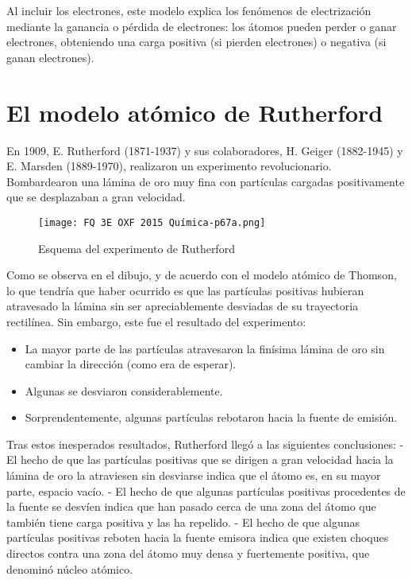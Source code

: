 \documentclass[
  spanish,
]{article}
\providecommand{\tightlist}{%
  \setlength{\itemsep}{0pt}\setlength{\parskip}{0pt}}
\begin{document}
Al incluir los electrones, este modelo explica los fenómenos de
electrización mediante la ganancia o pérdida de electrones: los átomos
pueden perder o ganar electrones, obteniendo una carga positiva (si
pierden electrones) o negativa (si ganan electrones).

\hypertarget{el-modelo-atuxf3mico-de-rutherford}{%
\section{El modelo atómico de
Rutherford}\label{el-modelo-atuxf3mico-de-rutherford}}

En 1909, E. Rutherford (1871-1937) y sus colaboradores, H. Geiger
(1882-1945) y E. Marsden (1889-1970), realizaron un experimento
revolucionario. Bombardearon una lámina de oro muy fina con partículas
cargadas positivamente que se desplazaban a gran velocidad.

\begin{figure}
\centering
\texttt{[image: FQ 3E OXF 2015 Química-p67a.png]}
\caption{Esquema del experimento de Rutherford}
\end{figure}

Como se observa en el dibujo, y de acuerdo con el modelo atómico de
Thomson, lo que tendría que haber ocurrido es que las partículas
positivas hubieran atravesado la lámina sin ser apreciablemente
desviadas de su trayectoria rectilínea. Sin embargo, este fue el
resultado del experimento:

\begin{itemize}
\tightlist
\item
  La mayor parte de las partículas atravesaron la finísima lámina de oro
  sin cambiar la dirección (como era de esperar).
\item
  Algunas se desviaron considerablemente.
\item
  Sorprendentemente, algunas partículas rebotaron hacia la fuente de
  emisión.
\end{itemize}

Tras estos inesperados resultados, Rutherford llegó a las siguientes
conclusiones: - El hecho de que las partículas positivas que se dirigen
a gran velocidad hacia la lámina de oro la atraviesen sin desviarse
indica que el átomo es, en su mayor parte, espacio vacío. - El hecho de
que algunas partículas positivas procedentes de la fuente se desvíen
indica que han pasado cerca de una zona del átomo que también tiene
carga positiva y las ha repelido. - El hecho de que algunas partículas
positivas reboten hacia la fuente emisora indica que existen choques
directos contra una zona del átomo muy densa y fuertemente positiva, que
denominó núcleo atómico.
\end{document}
